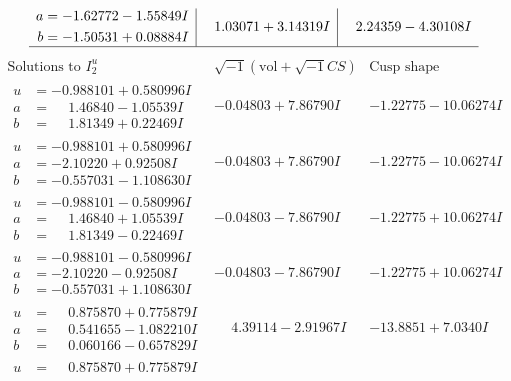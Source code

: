 \documentclass[1p]{elsarticle_modified}
\theoremstyle{definition}
\newcommand{\I}{\sqrt{-1}}
\begin{document}
$$\begin{array}{c|c|c}
\begin{aligned}
a &= -1.62772 - 1.55849 I \\
b &= -1.50531 + 0.08884 I\end{aligned}
 & \phantom{-}1.03071 + 3.14319 I & \phantom{-}2.24359 - 4.30108 I\\
 \hline 
 \end{array}$$\newpage$$\begin{array}{c|c|c}  
\text{Solutions to }I^u_{2}& \I (\text{vol} + \sqrt{-1}CS) & \text{Cusp shape}\\
 \hline 
\begin{aligned}
u &= -0.988101 + 0.580996 I \\
a &= \phantom{-}1.46840 - 1.05539 I \\
b &= \phantom{-}1.81349 + 0.22469 I\end{aligned}
 & -0.04803 + 7.86790 I & -1.22775 - 10.06274 I \\ \hline\begin{aligned}
u &= -0.988101 + 0.580996 I \\
a &= -2.10220 + 0.92508 I \\
b &= -0.557031 - 1.108630 I\end{aligned}
 & -0.04803 + 7.86790 I & -1.22775 - 10.06274 I \\ \hline\begin{aligned}
u &= -0.988101 - 0.580996 I \\
a &= \phantom{-}1.46840 + 1.05539 I \\
b &= \phantom{-}1.81349 - 0.22469 I\end{aligned}
 & -0.04803 - 7.86790 I & -1.22775 + 10.06274 I \\ \hline\begin{aligned}
u &= -0.988101 - 0.580996 I \\
a &= -2.10220 - 0.92508 I \\
b &= -0.557031 + 1.108630 I\end{aligned}
 & -0.04803 - 7.86790 I & -1.22775 + 10.06274 I \\ \hline\begin{aligned}
u &= \phantom{-}0.875870 + 0.775879 I \\
a &= \phantom{-}0.541655 - 1.082210 I \\
b &= \phantom{-}0.060166 - 0.657829 I\end{aligned}
 & \phantom{-}4.39114 - 2.91967 I & -13.8851 + 7.0340 I \\ \hline\begin{aligned}
u &= \phantom{-}0.875870 + 0.775879 I \\

\end{aligned}
\end{array}$$
\end{document}
